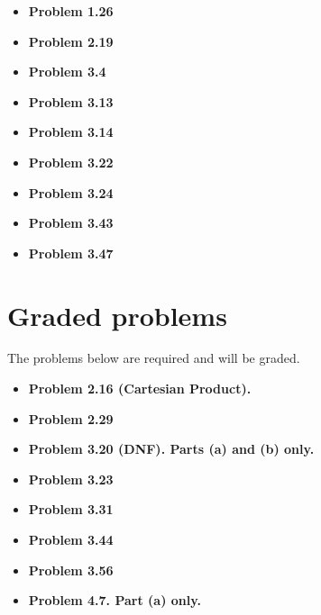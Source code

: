\documentclass[11pt]{article}
\begin{document}
\begin{multicols}{2}
\begin{itemize}

\item \textbf{Problem 1.26}

\item \textbf{Problem 2.19}

\item \textbf{Problem 3.4}

\item \textbf{Problem 3.13}

\item \textbf{Problem 3.14}

\item \textbf{Problem 3.22}

\item \textbf{Problem 3.24}

\item \textbf{Problem 3.43}

\item \textbf{Problem 3.47}

\end{itemize}
\end{multicols}

\section*{Graded problems}
The problems below are required and will be graded.
\begin{itemize}

\item \textbf{Problem 2.16 (Cartesian Product).}

\item \textbf{Problem 2.29}

\item \textbf{Problem 3.20 (DNF). Parts (a) and (b) only.}

\item \textbf{Problem 3.23}

\item \textbf{Problem 3.31}

\item \textbf{Problem 3.44}

\item \textbf{Problem 3.56}

\item \textbf{Problem 4.7. Part (a) only.}

\end{itemize}
\end{document}
